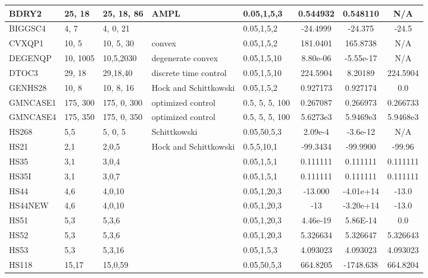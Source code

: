 \begin{landscape}
\begin{longtable}{l | l |  l  |  >{\footnotesize}p{3.5cm} | l | c | c | c  }
BDRY2   & 25, 18   & 25, 18, 86   &  AMPL  & 0.05,1,5,3  & 0.544932  & 0.548110  & N/A    \\ \hline   
BIGGSC4  & 4, 7   & 4, 0, 21   & & 0.05,1,5,2  & -24.4999   &  -24.375  &    -24.5 \\ \hline 
CVXQP1  & 10, 5 & 10, 5, 30  & convex   & 0.05,1,5,2 & 181.0401 & 165.8738  & N/A   \\ \hline
DEGENQP & 10, 1005 & 10,5,2030  & degenerate convex  & 0.05,1,5,10  & 8.80e-06 & -5.55e-17  & N/A \\ \hline
DTOC3   & 29, 18  & 29,18,40 & discrete time control & 0.05,1,5,10  &  224.5904 & 8.20189  & 224.5904 \\ \hline 
GENHS28 & 10, 8  & 10, 8, 16  & Hock and Schittkowski &   0.05,1,5,2   & 0.927173  & 0.927174  & 0.0   \\ \hline
GMNCASE1 &  175, 300   & 175, 0, 300  &   optimized control   & 0.5, 5, 5, 100   &   0.267087  & 0.266973             &    0.266733   \\ \hline
GMNCASE4 & 175, 350 & 175, 0, 350  &  optimized control &  0.5, 5, 5, 100      & 5.6273e3 &  5.9469e3 &    5.9468e3 \\ \hline 
HS268   & 5,5  & 5, 0, 5  &  Schittkowski   &  0.05,50,5,3    & 2.09e-4   & -3.6e-12      &    N/A    \\ \hline 
HS21    &  2,1 & 2,0,5   & Hock and  Schittkowski  &  0.5,5,10,1   & -99.3434  & -99.9900  & -99.96    \\ \hline 
HS35   &  3,1  & 3,0,4  &             &  0.05,1,5,1    & 0.111111  & 0.111111   &   0.111111   \\ \hline 
HS35I   &  3,1  & 3,0,7  &             &   0.05,1,5,1      & 0.111111  & 0.111111   &   0.111111   \\ \hline 
HS44   & 4,6   & 4,0,10   &  	 & 0.05,1,20,3      &  -13.000 & -4.01e+14 & -13.0    \\ \hline
HS44NEW & 4,6  & 4,0,10  &     &   0.05,1,20,3    & -13     & -3.20e+14   & -13.0    \\ \hline
HS51    &  5,3   & 5,3,6    &  & 0.05,1,20,3      & 4.46e-19   & 5.86E-14     & 0.0    \\ \hline
HS52    &  5,3  & 5,3,6   & & 0.05,1,20,3      & 5.326634   & 5.326647   & 5.326643   \\ \hline
HS53    &  5,3  & 5,3,16    &   &  0.05,1,5,3  & 4.093023   & 4.093023   & 4.093023  \\ \hline
HS118  & 15,17  & 15,0,59  & & 0.05,50,5,3   & 664.8205  & -1748.638  & 664.8204    \\ \hline

\end{longtable}
\end{landscape}

